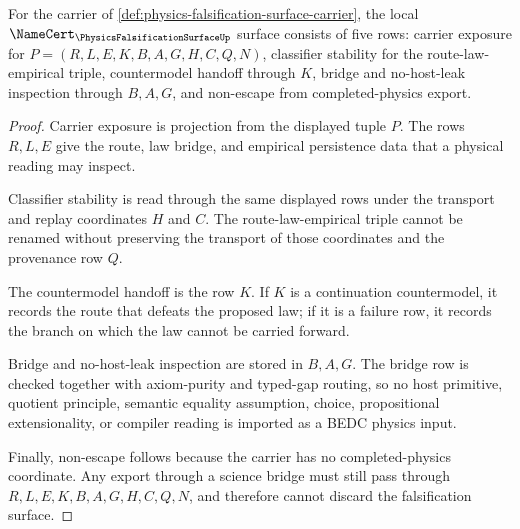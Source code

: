 \begin{theorem}
\label{thm:physics-falsification-surface-namecert-rows}
For the carrier of \autoref{def:physics-falsification-surface-carrier}, the local $\NameCert_{\PhysicsFalsificationSurfaceUp}$ surface consists of five rows: carrier exposure for $P=(R,L,E,K,B,A,G,H,C,Q,N)$, classifier stability for the route-law-empirical triple, countermodel handoff through $K$, bridge and no-host-leak inspection through $B,A,G$, and non-escape from completed-physics export.
\end{theorem}
\begin{proof}
Carrier exposure is projection from the displayed tuple $P$. The rows $R,L,E$ give the route, law bridge, and empirical persistence data that a physical reading may inspect.

Classifier stability is read through the same displayed rows under the transport and replay coordinates $H$ and $C$. The route-law-empirical triple cannot be renamed without preserving the transport of those coordinates and the provenance row $Q$.

The countermodel handoff is the row $K$. If $K$ is a continuation countermodel, it records the route that defeats the proposed law; if it is a failure row, it records the branch on which the law cannot be carried forward.

Bridge and no-host-leak inspection are stored in $B,A,G$. The bridge row is checked together with axiom-purity and typed-gap routing, so no host primitive, quotient principle, semantic equality assumption, choice, propositional extensionality, or compiler reading is imported as a BEDC physics input.

Finally, non-escape follows because the carrier has no completed-physics coordinate. Any export through a science bridge must still pass through $R,L,E,K,B,A,G,H,C,Q,N$, and therefore cannot discard the falsification surface.
\end{proof}




